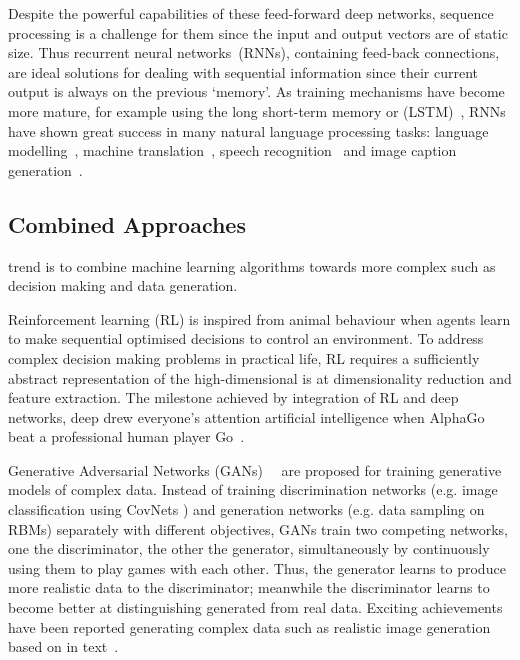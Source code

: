 Despite the powerful capabilities of these feed-forward deep networks, sequence processing is a challenge for them since the input and output vectors are of static size.
Thus recurrent neural networks~(RNNs), containing feed-back connections, are ideal solutions for dealing with sequential information since their current output is always \protect{} \protect{} on the previous `memory'.
As training mechanisms have become more mature, for example using the long short-term memory or (LSTM)~\citep{hochreiter1997long}, RNNs have shown great success in many natural language processing tasks: language modelling~\citep{mikolov2010recurrent}, machine translation~\citep{sutskever2014sequence}, speech recognition~\citep{graves2014towards} and image caption generation~\citep{karpathy2015deep}.

\subsection{Combined Approaches}
\protect{}
\protect{} trend \protect{} \protect{} is to combine machine learning algorithms towards more complex \protect{} \protect{} such as decision making and data generation.

Reinforcement learning (RL) is inspired from animal behaviour when agents learn to make sequential optimised decisions to control an environment.
To address complex decision making problems in practical life, RL requires a sufficiently abstract representation of the high-dimensional \protect{} \protect{} is \protect{} \protect{} at dimensionality reduction and feature extraction.
The milestone achieved by \protect{} integration of RL and deep networks, \protect{} deep \protect{} \protect{} drew everyone's attention \protect{} \protect{} artificial intelligence when AlphaGo beat a professional human player \protect{} \protect{} Go~\citep{silver2016mastering}.

Generative Adversarial Networks (GANs)~~\citep{goodfellow2014generative} are proposed for training generative models of complex data.
Instead of training discrimination networks (e.g. image classification using CovNets ) and generation networks (e.g. data sampling on RBMs) separately with different objectives, GANs train two competing networks, one the discriminator, the other the generator, simultaneously by continuously using them to play games with each other.
Thus, the generator learns to produce more realistic data to \protect{} \protect{} the discriminator; meanwhile the discriminator learns to become better at distinguishing generated from real data.
Exciting achievements have been reported \protect{} \protect{} generating complex data such as realistic image generation based on \protect{} \protect{} in text~\citep{radford2015unsupervised}.

